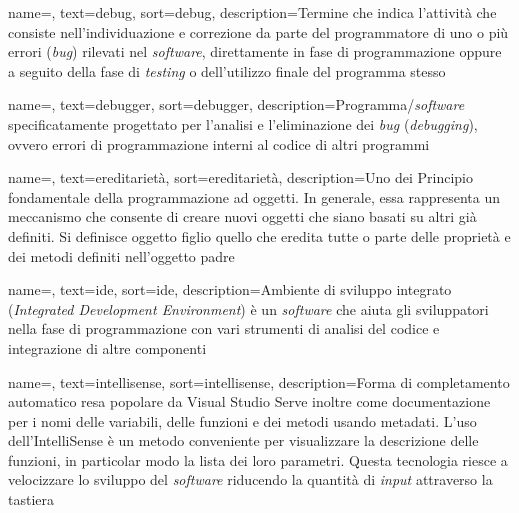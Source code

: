 {
    name=,
    text=debug,
    sort=debug,
    description={Termine che indica l’attività che
    consiste nell’individuazione e correzione da parte del programmatore di uno o più
    errori (\textit{bug}) rilevati nel \textit{software}, direttamente in fase di programmazione oppure
    a seguito della fase di \textit{testing} o dell’utilizzo finale del programma stesso}
}

{
    name=,
    text=debugger,
    sort=debugger,
    description={Programma/\textit{software} specificatamente
    progettato per l’analisi e l’eliminazione dei \textit{bug} (\textit{debugging}), ovvero errori di
    programmazione interni al codice di altri programmi}
}

{
    name=,
    text=ereditarietà,
    sort=ereditarietà,
    description={Uno dei Principio fondamentale della programmazione ad oggetti. In
    generale, essa rappresenta un meccanismo che consente di creare nuovi oggetti
    che siano basati su altri già definiti. Si definisce oggetto figlio 
    quello che eredita tutte o parte delle proprietà e dei metodi definiti nell’oggetto
    padre}
}

{
    name=,
    text=ide,
    sort=ide,
    description={Ambiente di sviluppo integrato
    (\textit{Integrated Development Environment}) è un
    \textit{software} che aiuta gli sviluppatori nella fase di programmazione con vari strumenti
    di analisi del codice e integrazione di altre componenti}
}

{
    name=,
    text=intellisense,
    sort=intellisense,
    description={Forma di completamento automatico resa popolare da Visual Studio
    Serve inoltre come documentazione per i
    nomi delle variabili, delle funzioni e dei metodi usando metadati. L’uso
    dell’IntelliSense è un metodo conveniente per visualizzare la descrizione delle
    funzioni, in particolar modo la lista dei loro parametri. Questa tecnologia riesce
    a velocizzare lo sviluppo del \textit{software} riducendo la quantità di \textit{input} attraverso
    la tastiera}
}

